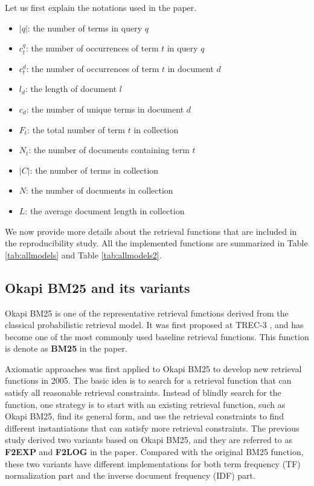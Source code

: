 Let us first explain the notations used in the paper. 
\begin{itemize} 
\item $|q|$: the number of terms in query $q$ 
\item $c_{t}^{q}$: the number of occurrences of term $t$ in query $q$ 
\item $c_{t}^{d}$: the number of occurrences of term $t$ in document $d$ 
\item $l_{d}$: the length of document $l$ 
\item $c_{d}$: the number of unique terms in document $d$ 
\item $F_{t}$: the total number of term $t$ in collection 
\item $N_{t}$: the number of documents containing term $t$ 
\item $|C|$: the number of terms in collection 
\item $N$: the number of documents in collection 
\item $L$: the average document length in collection 
\end{itemize} 

We now provide more details about the retrieval functions that 
are included in the reproducibility study. 
All the implemented functions are summarized in Table \ref{tab:allmodels} 
and Table \ref{tab:allmodels2}.  


\subsection{Okapi BM25 and its variants}

Okapi BM25 is one of the representative retrieval 
functions derived from the classical probabilistic 
retrieval model. It was first proposed at TREC-3 \cite{Robertson96okapiat3}, 
and has become one of the most commonly used baseline 
retrieval functions. This function is denote as \textbf{BM25}
in the paper.  

Axiomatic approaches was first applied to Okapi BM25 to 
develop new retrieval functions 
\cite{Fang:2005:EAA:1076034.1076116} in 2005. The basic idea 
is to search for a retrieval function that can satisfy 
all reasonable retrieval constraints. Instead of blindly 
search for the function, one strategy is to start with an 
existing retrieval function, such as Okapi BM25, find 
its general form, and use the retrieval constraints to 
find different instantiations that can satisfy more 
retrieval constraints. The previous study derived 
two variants based on Okapi BM25, and they are referred
to as \textbf{F2EXP} and \textbf{F2LOG} in the paper. 
Compared with the original BM25 function, these two variants
have different implementations for both term frequency (TF) 
normalization part and the inverse document frequency (IDF) part. 

